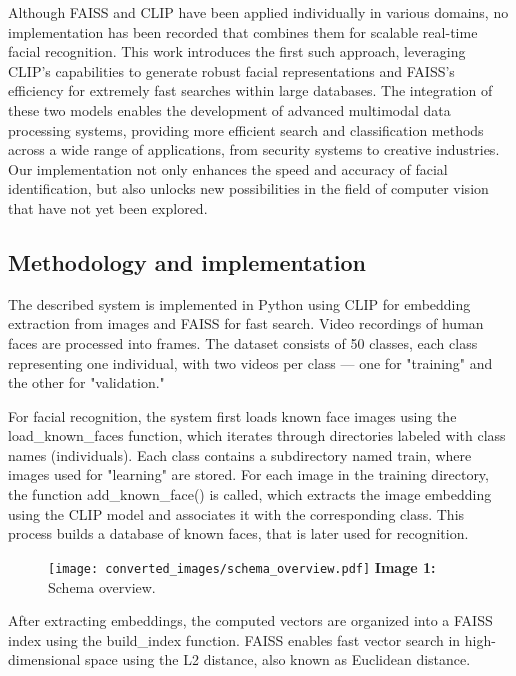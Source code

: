 \documentclass{article}
\begin{document}
\hspace*{1.00cm}Although FAISS and CLIP have been applied individually in various domains, no implementation has been recorded that combines them for scalable real-time facial recognition. This work introduces the first such approach, leveraging CLIP’s capabilities to generate robust facial representations and FAISS’s efficiency for extremely fast searches within large databases. The integration of these two models enables the development of advanced multimodal data processing systems, providing more efficient search and classification methods across a wide range of applications, from security systems to creative industries. Our implementation not only enhances the speed and accuracy of facial identification, but also unlocks new possibilities in the field of computer vision that have not yet been explored.

\subsection*{Methodology and implementation}
\hspace*{1.00cm}The described system is implemented in Python using CLIP for embedding extraction from images and FAISS for fast search. Video recordings of human faces are processed into frames. The dataset consists of 50 classes, each class representing one individual, with two videos per class — one for "training" and the other for "validation."

\hspace*{1.00cm}For facial recognition, the system first loads known face images using the load\_known\_faces function, which iterates through directories labeled with class names (individuals). Each class contains a subdirectory named train, where images used for "learning" are stored. For each image in the training directory, the function add\_known\_face() is called, which extracts the image embedding using the CLIP model and associates it with the corresponding class. This process builds a database of known faces, that is later used for recognition.

\begin{figure}[H]
    \centering
    \texttt{[image: converted\_images/schema\_overview.pdf]}
      \textbf{Image 1:} Schema overview.
\end{figure}


\hspace*{1.00cm}After extracting embeddings, the computed vectors are organized into a FAISS index using the build\_index function. FAISS enables fast vector search in high-dimensional space using the L2 distance, also known as Euclidean distance.\cite{brownleeDistance}
\end{document}
